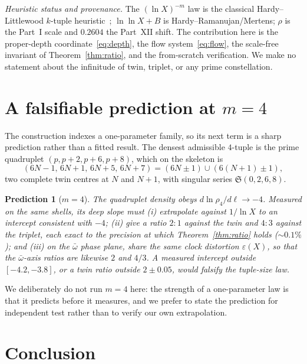 \documentclass[11pt]{article}
\newtheorem{prediction}{Prediction}
\begin{document}
\emph{Heuristic status and provenance.} The $(\ln X)^{-m}$ law is the classical
Hardy--Littlewood $k$-tuple heuristic~\cite{HL}; $\ln\ln X+B$ is
Hardy--Ramanujan/Mertens; $\rho$ is the Part~I scale and $0.2604$ the Part~XII
shift. The contribution here is the proper-depth coordinate~\eqref{eq:depth}, the
flow system~\eqref{eq:flow}, the scale-free invariant of
Theorem~\ref{thm:ratio}, and the from-scratch verification. We make no statement
about the infinitude of twin, triplet, or any prime constellation.

\section{A falsifiable prediction at $m=4$}

The construction indexes a one-parameter family, so its next term is a sharp
prediction rather than a fitted result. The densest admissible $4$-tuple is the
prime quadruplet $(p,p+2,p+6,p+8)$, which on the skeleton is
\[
  (6N-1,\,6N+1,\,6N+5,\,6N+7)=(6N\!\pm\!1)\cup(6(N{+}1)\!\pm\!1),
\]
two complete twin centres at $N$ and $N+1$, with singular series
$\mathfrak{S}(0,2,6,8)$.

\begin{prediction}[$m=4$]\label{pred:m4}
The quadruplet density obeys $d\ln\rho_4/d\ell\to-4$. Measured on the same shells,
its deep slope must (i) extrapolate against $1/\ln X$ to an intercept consistent
with $-4$; (ii) give a ratio $2{:}1$ against the twin and $4{:}3$ against the
triplet, each exact to the precision at which Theorem~\ref{thm:ratio} holds
($\sim0.1\%$); and (iii) on the $\bar\omega$ phase plane, share the same clock
distortion $\varepsilon(X)$, so that the $\bar\omega$-axis ratios are likewise
$2$ and $4/3$. A measured intercept outside $[-4.2,-3.8]$, or a twin ratio outside
$2\pm0.05$, would falsify the tuple-size law.
\end{prediction}

We deliberately do not run $m=4$ here: the strength of a one-parameter law is that
it predicts before it measures, and we prefer to state the prediction for
independent test rather than to verify our own extrapolation.

\section{Conclusion}
\end{document}
